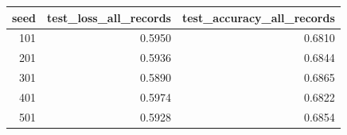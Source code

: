 \begin{tabular}{rrr}
\toprule
seed & test_loss_all_records & test_accuracy_all_records \\
\midrule
101 & 0.5950 & 0.6810 \\
201 & 0.5936 & 0.6844 \\
301 & 0.5890 & 0.6865 \\
401 & 0.5974 & 0.6822 \\
501 & 0.5928 & 0.6854 \\
\bottomrule
\end{tabular}
